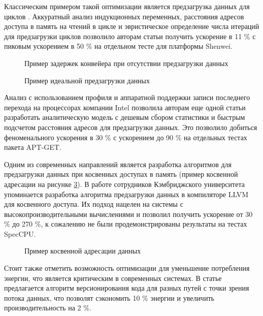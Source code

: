 Классическим примером такой оптимизации является предзагрузка данных для циклов \cite{chai2021implementation}. Аккуратный анализ индукционных переменных, расстояния адресов доступа в память на чтений в цикле и эвристическое определение числа итераций для предзагрузки циклов позволило авторам статьи \cite{chai2021implementation} получить ускорение в 11 \% с пиковым ускорением в 50 \%  на отдельном тесте для платформы Shenwei. 

 \begin{figure}[htbp]
	\centering
	
	\caption{Пример задержек конвейера при отсутствии предзагрузки данных \cite{chai2021implementation}}
	\label{partReview:prefetch1}
\end{figure}

 \begin{figure}[htbp]
	\centering
	
	\caption{Пример идеальной предзагрузки данных \cite{chai2021implementation}}
	\label{partReview:prefetch2}
\end{figure}

Анализ с использованием профиля и аппаратной поддержки записи последнего перехода на процессорах компании Intel позволила авторам еще одной статьи \cite{jamilan2022apt}  разработать  аналитическую модель с дешевым сбором статистики и быстрым подсчетом расстояния адресов для предзагрузки данных. Это позволило добиться феноменального ускорения в 30 \% с ускорением до 90 \% на отдельных тестах пакета APT-GET. 

Одним из современных направлений является разработка алгоритмов для предзагрузки данных при косвенных доступах в память (пример косвенной адресации на рисунке \ref{partReview:prefetch3}). В работе сотрудников Кэмбриджского университета \cite{purkayastha2020llvm}  упоминается разработка алгоритма предзагрузки данных в компиляторе LLVM для косвенного доступа. Их подход нацелен на  системы с высокопроизводительными вычислениями и позволил получить ускорение от 30 \% до 270 \%, к сожалению не были продемонстрированы результаты на тестах SpecCPU.
 \begin{figure}[htbp]
	\centering
	
	\caption{Пример косвенной адресации данных}
	\label{partReview:prefetch3}
\end{figure}
Стоит также отметить возможность оптимизации для уменьшение потребления энергии, что является критическим в современных системах. В статье \cite{ekemark2016static} предлагается алгоритм версионирования кода для разных путей с точки зрения потока данных, что позволят сэкономить 10 \% энергии и увеличить производительность на 2 \%.

